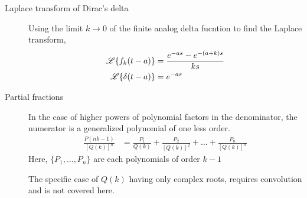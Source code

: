 \begin{description}
    \item[Laplace transform of Dirac's delta] Using the limit $ k \rightarrow 0 $ of the
        finite analog delta fucntion to find the Laplace transform,
        \begin{align}
            \operatorname{\mathscr{L}}\{f_k(t-a)\}    & = \frac{e^{-as} - e^{-(a+k)s}}{ks} \\
            \operatorname{\mathscr{L}}\{\delta(t-a)\} & = e^{-as}
        \end{align}
    \item[Partial fractions] In the case of higher powers of polynomial factors
        in the denominator, the numerator is a generalized polynomial of one less order.
        \begin{align}
            \frac{P(nk - 1)}{[Q(k)]^n} & = \frac{P_1}{Q(k)} + \frac{P_2}{[Q(k)]^2}
            + \dots + \frac{P_n}{[Q(k)]^n}
        \end{align}
        Here, $\{P_1, \dots, P_n\}$ are each polynomials of order $ k-1 $ \par
        The specific case of $ Q(k) $ having only complex roots, requires convolution and
        is not covered here.
\end{description}

